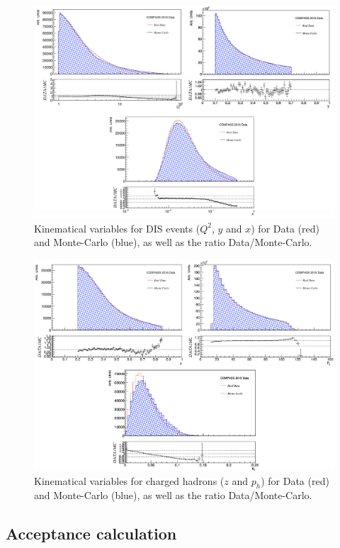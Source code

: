 \begin{figure}[!h]
  \centering
	\includegraphics[scale=0.45]{./gfx/DIS_kin.png}
	\caption{Kinematical variables for DIS events ($Q^2$, $y$ and $x$) for Data (red) and Monte-Carlo (blue), as well as the ratio Data/Monte-Carlo.}
	\label{pic:MCDISkin}
\end{figure}

\begin{figure}[!h]
  \centering
	\includegraphics[scale=0.45]{./gfx/SIDIS_kin.png}
	\caption{Kinematical variables for charged hadrons ($z$ and $p_h$) for Data (red) and Monte-Carlo (blue), as well as the ratio Data/Monte-Carlo.}
	\label{pic:MCSIDISkin}
\end{figure}

\subsection{Acceptance calculation}

